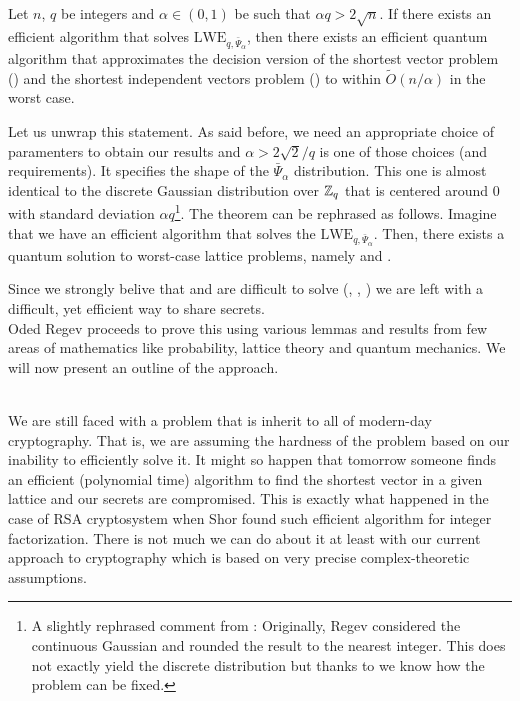 \begin{theorem}
    Let $n$, $q$ be integers and $\alpha \in (0, 1)$ be such that $\alpha q > 2 \sqrt{n}$. If there exists an efficient algorithm that solves $\text{LWE}_{q, \bar{\Psi}_{\alpha}}$, then there exists an efficient quantum algorithm that approximates the decision version of the shortest vector problem () and the shortest independent vectors problem () to within $\tilde{O}(n/\alpha)$ in the worst case.	
\end{theorem}

Let us unwrap this statement. As said before, we need an appropriate choice of paramenters to obtain our results and $\alpha > 2\sqrt{2}/q$ is one of those choices (and requirements). It specifies the shape of the $\bar{\Psi}_{\alpha}$ distribution. This one is almost identical to the discrete Gaussian distribution over $\mathbb{Z}_q$ that is centered around 0 with standard deviation $\alpha q$\footnote{A slightly rephrased comment from \cite{lattice-survey}: Originally, Regev considered the continuous Gaussian and rounded the result to the nearest integer. This does not exactly yield the discrete distribution but thanks to \cite{discr} we know how the problem can be fixed.}. The theorem can be rephrased as follows. Imagine that we have an efficient algorithm that solves the $\text{LWE}_{q, \bar{\Psi}_{\alpha}}$. Then, there exists a quantum solution to worst-case lattice problems, namely  and .

Since we strongly belive  that  and  are difficult to solve (\cite{svp-hard}, \cite{reductions}, \cite{cvp-hard}) we are left with a difficult, yet efficient way to share secrets. \\
Oded Regev proceeds to prove this using various lemmas and results from few areas of mathematics like probability, lattice theory and quantum mechanics. We will now present an outline of the approach.\\
 \\
\begin{remark}
    We are still faced with a problem that is inherit to all of modern-day cryptography. That is, we are assuming the hardness of the problem based on our inability to efficiently solve it. It might so happen that tomorrow someone finds an efficient (polynomial time) algorithm to find the shortest vector in a given lattice and our secrets are compromised. This is exactly what happened in the case of RSA cryptosystem when Shor found such efficient algorithm for integer factorization. There is not much we can do about it at least with our current approach to cryptography which is based on very precise complex-theoretic assumptions.
\end{remark}
